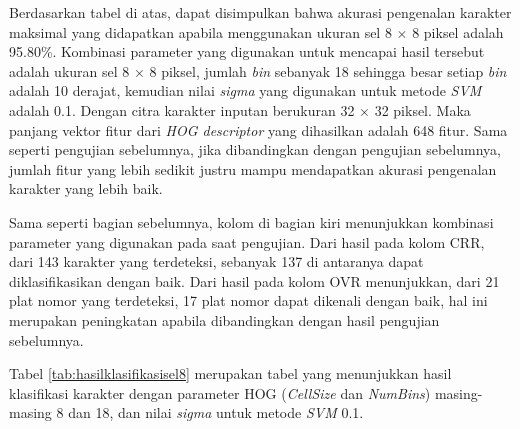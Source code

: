 \noindent Berdasarkan tabel di atas, dapat disimpulkan bahwa akurasi pengenalan karakter maksimal yang didapatkan apabila menggunakan ukuran sel 8 $\times$ 8 piksel adalah 95.80\%. Kombinasi parameter yang digunakan untuk mencapai hasil tersebut adalah ukuran sel 8 $\times$ 8 piksel, jumlah \textit{bin} sebanyak 18 sehingga besar setiap \textit{bin} adalah 10 derajat, kemudian nilai \textit{sigma} yang digunakan untuk metode \textit{SVM} adalah 0.1. Dengan citra karakter inputan berukuran 32 $\times$ 32 piksel. Maka panjang vektor fitur dari \textit{HOG descriptor} yang dihasilkan adalah 648 fitur. Sama seperti pengujian sebelumnya, jika dibandingkan dengan pengujian sebelumnya, jumlah fitur yang lebih sedikit justru mampu mendapatkan akurasi pengenalan karakter yang lebih baik.

\noindent Sama seperti bagian sebelumnya, kolom di bagian kiri menunjukkan kombinasi parameter yang digunakan pada saat pengujian. Dari hasil pada kolom CRR, dari 143 karakter yang terdeteksi, sebanyak 137 di antaranya dapat diklasifikasikan dengan baik. Dari hasil pada kolom OVR menunjukkan, dari 21 plat nomor yang terdeteksi, 17 plat nomor dapat dikenali dengan baik, hal ini merupakan peningkatan apabila dibandingkan dengan hasil pengujian sebelumnya.

\noindent Tabel \ref{tab:hasilklasifikasisel8} merupakan tabel yang menunjukkan hasil klasifikasi karakter dengan parameter HOG (\textit{CellSize} dan \textit{NumBins}) masing-masing 8 dan 18, dan nilai \textit{sigma} untuk metode \textit{SVM} 0.1.

